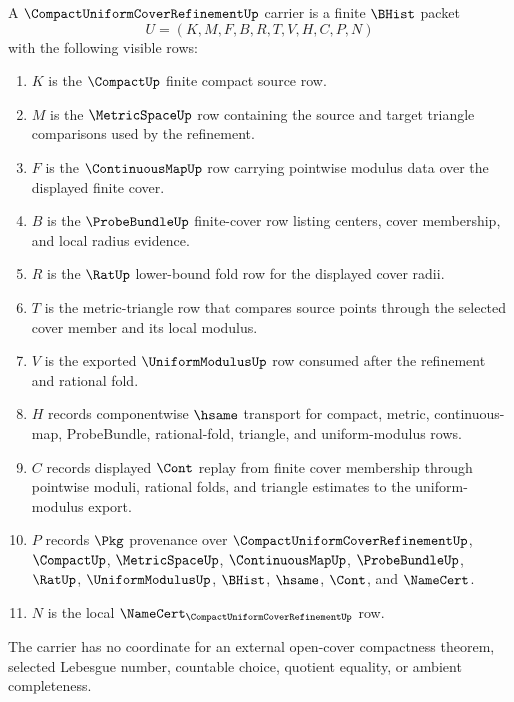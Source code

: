 \begin{definition}
\label{def:compact-uniform-cover-refinement-carrier}
A $\CompactUniformCoverRefinementUp$ carrier is a finite $\BHist$ packet
$$
U=(K,M,F,B,R,T,V,H,C,P,N)
$$
with the following visible rows:
\begin{enumerate}
\item $K$ is the $\CompactUp$ finite compact source row.
\item $M$ is the $\MetricSpaceUp$ row containing the source and target triangle comparisons used by the refinement.
\item $F$ is the $\ContinuousMapUp$ row carrying pointwise modulus data over the displayed finite cover.
\item $B$ is the $\ProbeBundleUp$ finite-cover row listing centers, cover membership, and local radius evidence.
\item $R$ is the $\RatUp$ lower-bound fold row for the displayed cover radii.
\item $T$ is the metric-triangle row that compares source points through the selected cover member and its local modulus.
\item $V$ is the exported $\UniformModulusUp$ row consumed after the refinement and rational fold.
\item $H$ records componentwise $\hsame$ transport for compact, metric, continuous-map, ProbeBundle, rational-fold, triangle, and uniform-modulus rows.
\item $C$ records displayed $\Cont$ replay from finite cover membership through pointwise moduli, rational folds, and triangle estimates to the uniform-modulus export.
\item $P$ records $\Pkg$ provenance over $\CompactUniformCoverRefinementUp$, $\CompactUp$, $\MetricSpaceUp$, $\ContinuousMapUp$, $\ProbeBundleUp$, $\RatUp$, $\UniformModulusUp$, $\BHist$, $\hsame$, $\Cont$, and $\NameCert$.
\item $N$ is the local $\NameCert_{\CompactUniformCoverRefinementUp}$ row.
\end{enumerate}
The carrier has no coordinate for an external open-cover compactness theorem, selected Lebesgue number, countable choice, quotient equality, or ambient completeness.
\end{definition}

